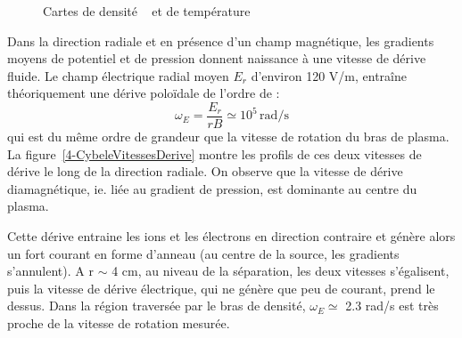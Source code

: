 \begin{refsection}
\begin{figure}[htbp]
  \centering
    \caption{Cartes de densité ~ et de
    température }
    \label{4-CybeleCarteFlux}
\end{figure}

Dans la direction radiale et en présence d'un champ magnétique, les gradients
moyens de potentiel et de pression donnent naissance à une vitesse de dérive
fluide. Le champ électrique radial moyen $E_r$ d'environ 120 V/m, entraîne
théoriquement une dérive poloïdale de l'ordre de :
\begin{equation}
\omega_E=\frac{E_r}{rB}\simeq10^5\,\text{rad/s} 
\end{equation}
qui est du même ordre de grandeur que la vitesse de rotation du bras de plasma.
La figure~\ref{4-CybeleVitessesDerive} montre les profils de ces deux vitesses
de dérive le long de la direction radiale. On observe que la vitesse de dérive
diamagnétique, ie. liée au gradient de pression, est dominante au centre du
plasma. 

Cette dérive entraine les ions et les électrons en direction
contraire et génère alors un fort courant en forme d'anneau (au centre de la
source, les gradients s'annulent). A r $\sim$ 4 cm, au niveau de la séparation,
les deux vitesses s'égalisent, puis la vitesse de dérive électrique, qui ne
génère que peu de courant, prend le dessus. Dans la région traversée par le bras
de densité, $\omega_E\simeq$ 2.3 rad/s est très proche de la vitesse de rotation
mesurée.


\end{refsection}
